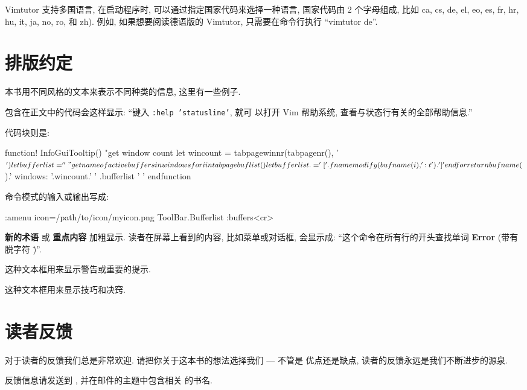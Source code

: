 Vimtutor 支持多国语言, 在启动程序时, 可以通过指定国家代码来选择一种语言, 
国家代码由 2 个字母组成, 比如 ca, cs, de, el, eo, es, fr, hr, hu, it, ja,
no, ro, 和 zh). 例如, 如果想要阅读德语版的 Vimtutor, 只需要在命令行执行
``vimtutor de''.

\section*{排版约定}
\label{sec:conventions}
本书用不同风格的文本来表示不同种类的信息, 这里有一些例子.

包含在正文中的代码会这样显示: ``键入 \texttt{:help 'statusline'}, 就可
以打开 Vim 帮助系统, 查看与状态行有关的全部帮助信息.''

代码块则是:
\begin{vimscript}
function! InfoGuiTooltip()
    "get window count
    let wincount = tabpagewinnr(tabpagenr(), '$')
    let bufferlist=''
    "get name of active buffers in windows
    for i in tabpagebuflist()
        let bufferlist .= '['.fnamemodify(bufname(i), ':t').'] '
    endfor
    return bufname($).' windows: '.wincount.' ' .bufferlist ' '
endfunction
\end{vimscript}

命令模式的输入或输出写成:
\begin{vimcmd}
:amenu icon=/path/to/icon/myicon.png ToolBar.Bufferlist :buffers<cr>
\end{vimcmd}

\textbf{新的术语} 或 \textbf{重点内容} 加粗显示. 读者在屏幕上看到的内容,
比如菜单或对话框, 会显示成: ``这个命令在所有行的开头查找单词 \textbf{Error}
(带有脱字符 \^)''.

\begin{warning}
这种文本框用来显示警告或重要的提示.
\end{warning}

\begin{tips}
这种文本框用来显示技巧和决窍.
\end{tips}

\section*{读者反馈}
\label{sec:reader_feedback}
对于读者的反馈我们总是非常欢迎. 请把你关于这本书的想法选择我们 --- 不管是
优点还是缺点, 读者的反馈永远是我们不断进步的源泉.

反馈信息请发送到 , 并在邮件的主题中包含相关
的书名.

